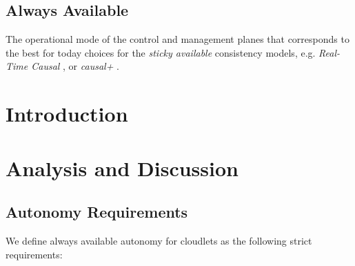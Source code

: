\documentclass[conference]{IEEEtran}
\begin{document}
\subsection{Always Available}

The operational mode of the control and management planes that corresponds to
the best for today choices for the \textit{sticky available}\cite{b4}
consistency models, e.g. \textit{Real-Time Causal} \cite{b2}, or
\textit{causal+} \cite{b1}.

\section{Introduction}

\section{Analysis and Discussion}

\subsection{Autonomy Requirements}

We define always available autonomy for cloudlets as the following strict
requirements:
\end{document}

